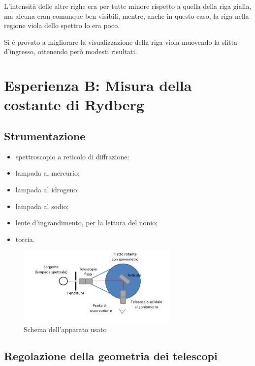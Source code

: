 \documentclass[a4paper,10pt]{article}
\begin{document}
{{{{{{L'intensità delle altre righe era per tutte minore rispetto a quella della riga gialla, ma alcuna eran comunque ben visibili, mentre, anche in questo caso, la riga nella regione viola dello spettro lo era poco.

Si è provato a migliorare la visualizzazione della riga viola muovendo la slitta d'ingresso, ottenendo però modesti risultati.

\section{Esperienza B: Misura della costante di Rydberg}

\subsection{Strumentazione}

\begin{itemize}
	\item spettroscopio a reticolo di diffrazione:

	\item lampada al mercurio;
	\item lampada al idrogeno;
	\item lampada al sodio;
	\item lente d'ingrandimento, per la lettura del nonio;
	\item torcia.
\end{itemize}

\begin{figure}[H]
	\centering
	\includegraphics[width=0.7\textwidth]{../grafici/Schema2.png}
	\caption{Schema dell'apparato usato}
	\label{fig:schema2}
\end{figure}

\subsection{Regolazione della geometria dei telescopi}

}}}}}}
\end{document}
